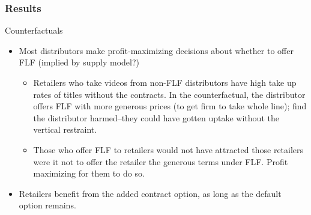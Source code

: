 \begin{frame}
\frametitle{Results}

Counterfactuals

\begin{itemize}
\item Most distributors make profit-maximizing decisions about whether to
offer FLF (implied by supply model?)

\begin{itemize}
\item Retailers who take videos from non-FLF distributors have high take up
rates of titles without the contracts. In the counterfactual, the
distributor offers FLF with more generous prices (to get firm to take whole
line); find the distributor harmed--they could have gotten uptake without
the vertical restraint.

\item Those who offer FLF to retailers would not have attracted those
retailers were it not to offer the retailer the generous terms under FLF.
Profit maximizing for them to do so.
\end{itemize}

\item Retailers benefit from the added contract option, as long as the
default option remains.
\end{itemize}
\end{frame}



